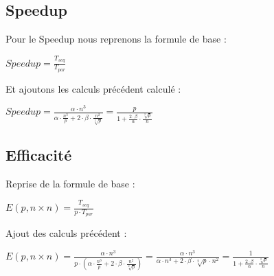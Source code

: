 \documentclass[a4paper]{article}
\begin{document}
\subsection{Speedup}
Pour le Speedup nous reprenons la formule de base :
\begin{center}
$Speedup = \frac{T_{seq}}{T_{par}}$
\end{center}
Et ajoutons les calculs précédent calculé :
\begin{center}
$Speedup = \frac{\alpha \cdot n^3}{\alpha \cdot \frac{n^3}{p} + 2 \cdot \beta \cdot \frac{n^2}{\sqrt[2]{p}}} = \frac{p}{1+\frac{2 \cdot \beta}{\alpha} \cdot \frac{\sqrt[2]{p}}{n}}$
\end{center}

\subsection{Efficacité}
Reprise de la formule de base : 
\begin{center}
$E(p,n \times n) = \frac{T_{seq}}{p \cdot T_{par}}$
\end{center}
Ajout des calculs précédent :
\begin{center}
$E(p,n \times n) = \frac{\alpha \cdot n^3}{p \cdot (\alpha \cdot \frac{n^3}{p}+2 \cdot \beta \cdot \frac{n^2}{\sqrt[2]{p}})} = \frac{\alpha \cdot n^3}{\alpha \cdot n^3+2 \cdot \beta \cdot \sqrt[2]{p} \cdot n^2} = \frac{1}{1+\frac{2 \cdot \beta}{\alpha} \cdot \frac{\sqrt[2]{p}}n}$
\end{center}
\end{document}
